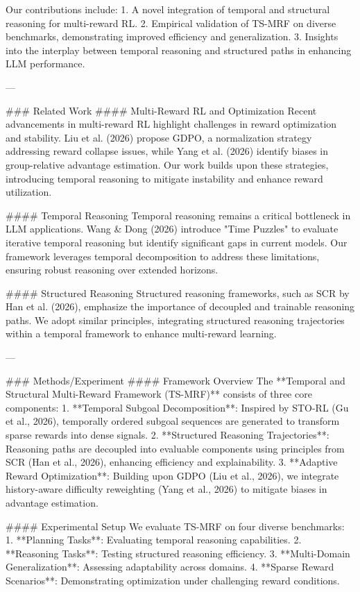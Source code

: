 Our contributions include:
1. A novel integration of temporal and structural reasoning for multi-reward RL.
2. Empirical validation of TS-MRF on diverse benchmarks, demonstrating improved efficiency and generalization.
3. Insights into the interplay between temporal reasoning and structured paths in enhancing LLM performance.

---

### Related Work
#### Multi-Reward RL and Optimization
Recent advancements in multi-reward RL highlight challenges in reward optimization and stability. Liu et al. (2026) propose GDPO, a normalization strategy addressing reward collapse issues, while Yang et al. (2026) identify biases in group-relative advantage estimation. Our work builds upon these strategies, introducing temporal reasoning to mitigate instability and enhance reward utilization.

#### Temporal Reasoning
Temporal reasoning remains a critical bottleneck in LLM applications. Wang & Dong (2026) introduce "Time Puzzles" to evaluate iterative temporal reasoning but identify significant gaps in current models. Our framework leverages temporal decomposition to address these limitations, ensuring robust reasoning over extended horizons.

#### Structured Reasoning
Structured reasoning frameworks, such as SCR by Han et al. (2026), emphasize the importance of decoupled and trainable reasoning paths. We adopt similar principles, integrating structured reasoning trajectories within a temporal framework to enhance multi-reward learning.

---

### Methods/Experiment
#### Framework Overview
The **Temporal and Structural Multi-Reward Framework (TS-MRF)** consists of three core components:
1. **Temporal Subgoal Decomposition**: Inspired by STO-RL (Gu et al., 2026), temporally ordered subgoal sequences are generated to transform sparse rewards into dense signals.
2. **Structured Reasoning Trajectories**: Reasoning paths are decoupled into evaluable components using principles from SCR (Han et al., 2026), enhancing efficiency and explainability.
3. **Adaptive Reward Optimization**: Building upon GDPO (Liu et al., 2026), we integrate history-aware difficulty reweighting (Yang et al., 2026) to mitigate biases in advantage estimation.

#### Experimental Setup
We evaluate TS-MRF on four diverse benchmarks:
1. **Planning Tasks**: Evaluating temporal reasoning capabilities.
2. **Reasoning Tasks**: Testing structured reasoning efficiency.
3. **Multi-Domain Generalization**: Assessing adaptability across domains.
4. **Sparse Reward Scenarios**: Demonstrating optimization under challenging reward conditions.

